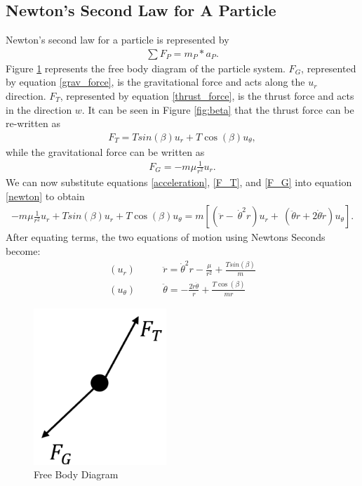 \documentclass[]{article}
\begin{document}
	\subsection{Newton's Second Law for A Particle}
	Newton's second law for a particle is represented by
	\begin{align}
		\sum{F_{P}} = m_{P} * a_{P}. \label{newton}
	\end{align}
	\vspace{2mm}\newline
	Figure \ref{fig:FBD} represents the free body diagram of the particle system. \(F_{G}\), represented by equation \ref{grav_force}, is the gravitational force and acts along the \(u_{r}\) direction. \(F_{T}\), represented by equation \ref{thrust_force}, is the thrust force and acts in the direction \(w\). It can be seen in Figure \ref{fig:beta} that the thrust force can be re-written as 
	\begin{align}
		F_{T} = Tsin(\beta)u_{r} + T\cos(\beta)u_{\theta}, \label{F_T}
	\end{align}
	while the gravitational force can be written as
	\begin{align}
		F_{G} = -m\mu\frac{1}{r^2}u_{r}. \label{F_G}
	\end{align}
	We can now substitute equations \ref{acceleration},  \ref{F_T}, and \ref{F_G} into equation \ref{newton} to obtain
	\begin{align*}
		-m\mu\frac{1}{r^2}u_{r} + Tsin(\beta)u_{r} + T\cos(\beta)u_{\theta} = m[(\ddot{r} -\ \dot{\theta}^2r)u_{r} +\ (\ddot{\theta}r+2\dot{\theta}\dot{r})u_{\theta}]. 
	\end{align*}
	After equating terms, the two equations of motion using Newtons Seconds become:
	\begin{align}
		(u_{r})\qquad      &  \ddot{r}      = \dot{\theta}^2r - \frac{\mu}{r^2} + \frac{Tsin(\beta)}{m} \label{eom1}\\
		(u_{\theta})\qquad &  \ddot{\theta} = -\frac{2\dot{r}\dot{\theta}}{r}   + \frac{T\cos(\beta)}{mr} \label{eom2}
	\end{align}
	\begin{figure}
		\centering
		\includegraphics[width=50mm,scale=0.5]{FBD.png}
		\caption{Free Body Diagram}
		\label{fig:FBD}
	\end{figure}
\end{document}

